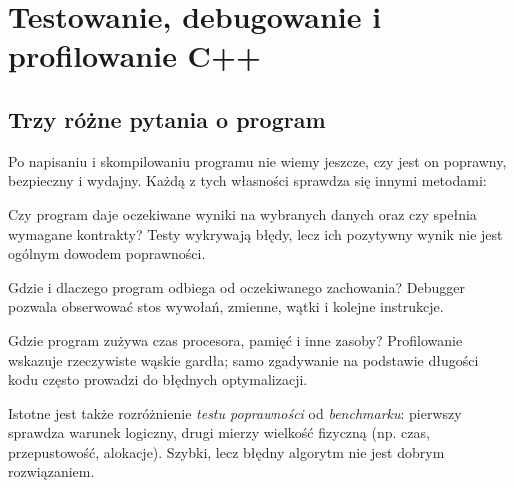 
\chapter{Testowanie, debugowanie i profilowanie C++}
\label{chap:cpp18-test-debug-profile}

\section{Trzy różne pytania o program}

Po napisaniu i skompilowaniu programu nie wiemy jeszcze, czy jest on
poprawny, bezpieczny i wydajny. Każdą z tych własności sprawdza się
innymi metodami:
\begin{description}[style=nextline]
\item[Testowanie (\emph{testing})]
Czy program daje oczekiwane wyniki na wybranych danych oraz czy
spełnia wymagane kontrakty? Testy wykrywają błędy, lecz ich pozytywny
wynik nie jest ogólnym dowodem poprawności.
\item[Debugowanie (\emph{debugging})]
Gdzie i dlaczego program odbiega od oczekiwanego zachowania?
Debugger pozwala obserwować stos wywołań, zmienne, wątki i kolejne
instrukcje.
\item[Profilowanie (\emph{profiling})]
Gdzie program zużywa czas procesora, pamięć i inne zasoby?
Profilowanie wskazuje rzeczywiste wąskie gardła; samo zgadywanie
na podstawie długości kodu często prowadzi do błędnych optymalizacji.
\end{description}

Istotne jest także rozróżnienie \emph{testu poprawności} od
\emph{benchmarku}: pierwszy sprawdza warunek logiczny, drugi mierzy
wielkość fizyczną (np. czas, przepustowość, alokacje). Szybki, lecz
błędny algorytm nie jest dobrym rozwiązaniem.


